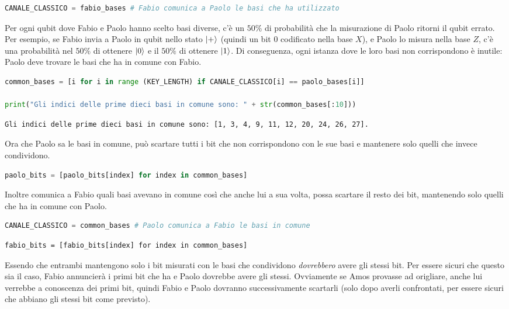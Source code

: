 \documentclass[a4paper]{article}
\begin{document}
\begin{lstlisting}[language=Python]
CANALE_CLASSICO = fabio_bases # Fabio comunica a Paolo le basi che ha utilizzato
\end{lstlisting}
Per ogni qubit dove Fabio e Paolo hanno scelto basi diverse, c'è un $50\%$ di probabilità
che la misurazione di Paolo ritorni il qubit errato. 
Per esempio, se Fabio invia a Paolo in qubit nello stato $\ket{+}$ (quindi un bit 
0 codificato nella base $X$), e Paolo lo misura nella base \( Z \), c'è una probabilità
nel $50\%$ di ottenere $\ket{0}$ e il $50\%$ di ottenere $\ket{1}$.
Di conseguenza, ogni istanza dove le loro basi non corrispondono è inutile: Paolo deve
trovare le basi che ha in comune con Fabio.
\begin{lstlisting}[language=Python]
common_bases = [i for i in range (KEY_LENGTH) if CANALE_CLASSICO[i] == paolo_bases[i]]

print("Gli indici delle prime dieci basi in comune sono: " + str(common_bases[:10]))
\end{lstlisting}
\begin{lstlisting}
Gli indici delle prime dieci basi in comune sono: [1, 3, 4, 9, 11, 12, 20, 24, 26, 27].
\end{lstlisting}
Ora che Paolo sa le basi in comune, può scartare tutti i bit che non corrispondono con le sue basi
e mantenere solo quelli che invece condividono.
\begin{lstlisting}[language=Python]
paolo_bits = [paolo_bits[index] for index in common_bases]
\end{lstlisting}
Inoltre comunica a Fabio quali basi avevano in comune così che anche lui a sua volta, 
possa scartare il resto dei bit, mantenendo solo quelli che ha in comune con Paolo.
\begin{lstlisting}[language=Python]
CANALE_CLASSICO = common_bases # Paolo comunica a Fabio le basi in comune
\end{lstlisting}
\begin{lstlisting}
fabio_bits = [fabio_bits[index] for index in common_bases]
\end{lstlisting}
Essendo che entrambi mantengono solo i bit misurati con le basi che condividono
\textit{dovrebbero} avere gli stessi bit. Per essere sicuri che questo sia il caso,
Fabio annuncierà i primi bit che ha e Paolo dovrebbe avere gli stessi. 
Ovviamente se Amos provasse ad origliare, anche lui verrebbe a conoscenza dei primi bit,
quindi Fabio e Paolo dovranno successivamente scartarli (solo dopo averli confrontati,
per essere sicuri che abbiano gli stessi bit come previsto). 
\end{document}
